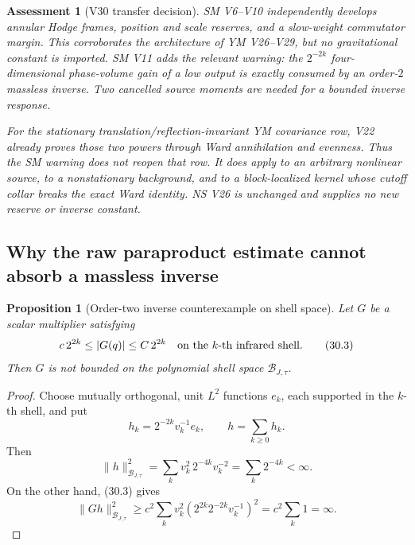 \documentclass[11pt,oneside]{book}
\newtheorem{proposition}[theorem]{Proposition}
\newtheorem{assessment}[theorem]{Assessment}
\theoremstyle{definition}
\theoremstyle{remark}
\begin{document}
\begin{assessment}[V30 transfer decision]
\label{ass:e8v30-transfer}
SM V6--V10 independently develops annular Hodge frames, position and
scale reserves, and a slow-weight commutator margin.  This corroborates
the architecture of YM V26--V29, but no gravitational constant is
imported.  SM V11 adds the relevant warning: the \(2^{-2k}\)
four-dimensional phase-volume gain of a low output is exactly consumed
by an order-\(2\) massless inverse.  Two cancelled source moments are
needed for a bounded inverse response.

For the stationary translation/reflection-invariant YM covariance row,
V22 already proves those two powers through Ward annihilation and
evenness.  Thus the SM warning does not reopen that row.  It does apply
to an arbitrary nonlinear source, to a nonstationary background, and
to a block-localized kernel whose cutoff collar breaks the exact Ward
identity.  NS V26 is unchanged and supplies no new reserve or inverse
constant.
\end{assessment}

\subsection{Why the raw paraproduct estimate cannot absorb a massless
inverse}

\begin{proposition}[Order-two inverse counterexample on shell space]
\label{prop:e8v30-inverse-counterexample}
Let \(G\) be a scalar multiplier satisfying
\[
 c\,2^{2k}\leq |G(q)|\leq C\,2^{2k}
\quad\hbox{on the \(k\)-th infrared shell}.                       \tag{30.3}
\]
Then \(G\) is not bounded on the polynomial shell space
\(\mathcal B_{J,\tau}\).
\end{proposition}

\begin{proof}
Choose mutually orthogonal, unit \(L^2\) functions \(e_k\), each
supported in the \(k\)-th shell, and put
\[
                         h_k=2^{-2k}v_k^{-1}e_k,\qquad
                         h=\sum_{k\geq0}h_k.                      \tag{30.4}
\]
Then
\[
 \|h\|_{\mathcal B_{J,\tau}}^2
 =\sum_kv_k^2\,2^{-4k}v_k^{-2}
 =\sum_k2^{-4k}<\infty.                                          \tag{30.5}
\]
On the other hand, (30.3) gives
\[
 \|Gh\|_{\mathcal B_{J,\tau}}^2
 \geq c^2\sum_kv_k^2
       (2^{2k}2^{-2k}v_k^{-1})^2
 =c^2\sum_k1=\infty.                                             \tag{30.6}
\]
\end{proof}
\end{document}
